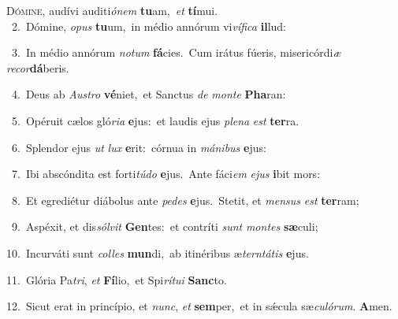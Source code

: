 \lettrine{\initial\textcolor{\initialcolor}{D}}{ómine,} audívi auditi\-\textit{ó}\-\textit{nem} \textbf{tu}\-am,~\star \textit{et} \textbf{tí}\-mui.\\
{\numbfont\textcolor{\numbcolor}{~2.}}~Dómine, \textit{o}\-\textit{pus} \textbf{tu}\-um,~\star in médio annórum vi\-\textit{ví}\-\textit{fi}\textit{ca} \textbf{il}\-lud:\par
{\numbfont\textcolor{\numbcolor}{~3.}}~In médio annórum \textit{no}\-\textit{tum} \textbf{fá}\-cies.~\star Cum irátus fúeris, misericórdi\textit{æ} \textit{re}\-\textit{cor}\textbf{dá}beris.\par
{\numbfont\textcolor{\numbcolor}{~4.}}~Deus ab \textit{Aus}\-\textit{tro} \textbf{vé}\-niet,~\star et Sanctus \textit{de} \textit{mon}\-\textit{te} \textbf{Pha}\-ran:\par
{\numbfont\textcolor{\numbcolor}{~5.}}~Opéruit cælos gló\-\textit{ri}\-\textit{a} \textbf{e}\-jus:~\star et laudis ejus \textit{ple}\-\textit{na} \textit{est} \textbf{ter}\-ra.\par
{\numbfont\textcolor{\numbcolor}{~6.}}~Splendor ejus \textit{ut} \textit{lux} \textbf{e}\-rit:~\star córnua in \textit{má}\-\textit{ni}\textit{bus} \textbf{e}\-jus:\par
{\numbfont\textcolor{\numbcolor}{~7.}}~Ibi abscóndita est forti\-\textit{tú}\-\textit{do} \textbf{e}\-jus.~\star Ante fáci\textit{em} \textit{e}\-\textit{jus} \textbf{i}\-bit mors:\par
{\numbfont\textcolor{\numbcolor}{~8.}}~Et egrediétur diábolus ante \textit{pe}\-\textit{des} \textbf{e}\-jus.~\star Stetit, et \textit{men}\-\textit{sus} \textit{est} \textbf{ter}\-ram;\par
{\numbfont\textcolor{\numbcolor}{~9.}}~Aspéxit, et dis\-\textit{sól}\-\textit{vit} \textbf{Gen}\-tes:~\star et contríti \textit{sunt} \textit{mon}\-\textit{tes} \textbf{sæ}\-culi;\par
{\numbfont\textcolor{\numbcolor}{10.}}~Incurváti sunt \textit{col}\-\textit{les} \textbf{mun}\-di,~\star ab itinéribus æ\-\textit{tern}\-\textit{tá}\textit{tis} \textbf{e}\-jus.\par
{\numbfont\textcolor{\numbcolor}{11.}}~Glória Pa\-\textit{tri}\-, \textit{et} \textbf{Fí}\-lio,~\star et Spi\-\textit{rí}\-\textit{tu}\textit{i} \textbf{Sanc}\-to.\par
{\numbfont\textcolor{\numbcolor}{12.}}~Sicut erat in princípio, et \textit{nunc}\-, \textit{et} \textbf{sem}\-per,~\star et in sǽcula sæ\-\textit{cu}\-\textit{ló}\textit{rum}. \textbf{A}\-men.\par
